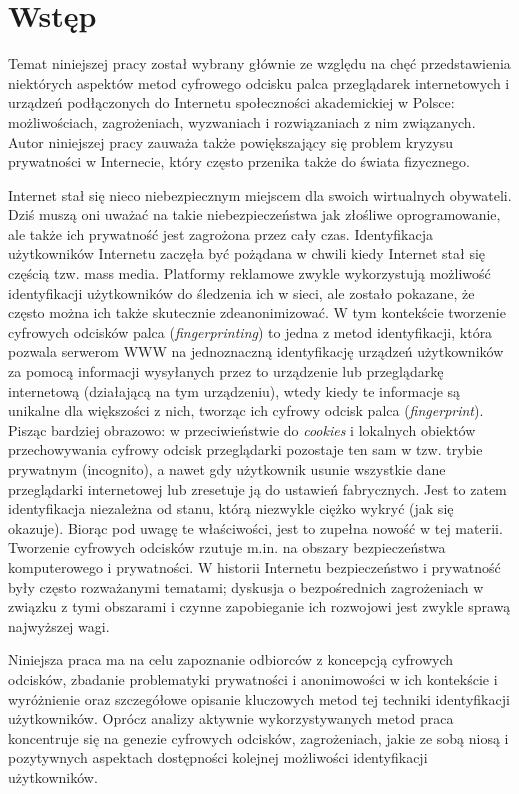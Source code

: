 \chapter*{Wstęp}
Temat niniejszej pracy został wybrany głównie ze względu na chęć przedstawienia
niektórych aspektów metod cyfrowego odcisku palca przeglądarek internetowych i
urządzeń podłączonych do Internetu społeczności akademickiej w Polsce:
możliwościach, zagrożeniach, wyzwaniach i rozwiązaniach z nim związanych. Autor
niniejszej pracy zauważa także powiększający się problem kryzysu prywatności w
Internecie, który często przenika także do świata fizycznego.

Internet stał się nieco niebezpiecznym miejscem dla swoich wirtualnych
obywateli. Dziś muszą oni uważać na takie niebezpieczeństwa jak złośliwe
oprogramowanie, ale także ich prywatność jest zagrożona przez cały czas.
Identyfikacja użytkowników Internetu zaczęła być pożądana w chwili kiedy
Internet stał się częścią tzw. mass media. Platformy reklamowe zwykle
wykorzystują możliwość identyfikacji użytkowników do śledzenia ich w sieci, ale
zostało pokazane, że często można ich także skutecznie zdeanonimizować. W tym
kontekście tworzenie cyfrowych odcisków palca (\emph{fingerprinting}) to jedna z
metod identyfikacji, która pozwala serwerom WWW na jednoznaczną identyfikację
urządzeń użytkowników za pomocą informacji wysyłanych przez to urządzenie lub
przeglądarkę internetową (działającą na tym urządzeniu), wtedy kiedy te
informacje są unikalne dla większości z nich, tworząc ich cyfrowy odcisk palca
(\emph{fingerprint}). Pisząc bardziej obrazowo: w przeciwieństwie do
\emph{cookies} i lokalnych obiektów przechowywania cyfrowy odcisk przeglądarki
pozostaje ten sam w tzw. trybie prywatnym (incognito), a nawet gdy użytkownik
usunie wszystkie dane przeglądarki internetowej lub zresetuje ją do ustawień
fabrycznych. Jest to zatem identyfikacja niezależna od stanu, którą niezwykle
ciężko wykryć (jak się okazuje). Biorąc pod uwagę te właściwości, jest to
zupełna nowość w tej materii. Tworzenie cyfrowych odcisków rzutuje m.in. na
obszary bezpieczeństwa komputerowego i prywatności. W historii Internetu
bezpieczeństwo i prywatność były często rozważanymi tematami; dyskusja o
bezpośrednich zagrożeniach w związku z tymi obszarami i czynne zapobieganie ich
rozwojowi jest zwykle sprawą najwyższej wagi.

Niniejsza praca ma na celu zapoznanie odbiorców z koncepcją cyfrowych odcisków,
zbadanie problematyki prywatności i anonimowości w ich kontekście i wyróżnienie
oraz szczegółowe opisanie kluczowych metod tej techniki identyfikacji
użytkowników. Oprócz analizy aktywnie wykorzystywanych metod praca koncentruje
się na genezie cyfrowych odcisków, zagrożeniach, jakie ze sobą niosą i
pozytywnych aspektach dostępności kolejnej możliwości identyfikacji
użytkowników.

